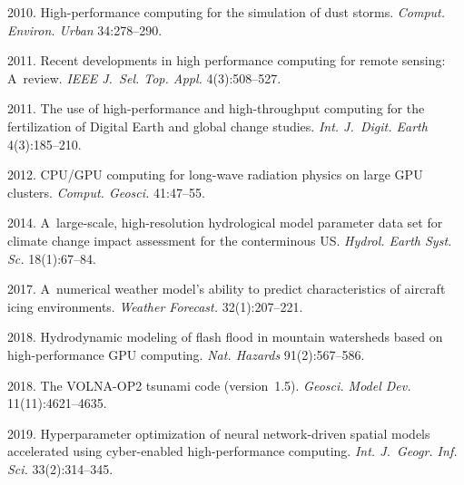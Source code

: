   \begin{multicols}{2}

\renewcommand{\bibname}{\protect\rmfamily References}

{\small\frenchspacing
 {%
 \begin{thebibliography}{99}
 2010. High-performance computing for the simulation of dust storms. 
 \textit{Comput. Environ. Urban} 34:278--290.

 2011. Recent developments in high performance computing for remote sensing: A~review. 
 \textit{IEEE J.~Sel. Top. Appl.} 4(3):508--527.

 2011. The use of high-performance 
and high-throughput computing for the fertilization of Digital
 Earth and global change studies. \textit{Int. J.~Digit. Earth} 4(3):185--210.

 2012. 
CPU/GPU computing for long-wave radiation physics on large GPU clusters. 
\textit{Comput. Geosci.} 41:47--55.

 2014. A~large-scale, high-resolution hydrological model parameter data set 
 for climate change impact assessment for the conterminous US. 
 \textit{Hydrol. Earth Syst. Sc.} 18(1):67--84.

 2017. A~numerical weather model's ability to predict characteristics of 
 aircraft icing environments. \textit{Weather Forecast.} 32(1):207--221.

 2018. Hydrodynamic modeling of flash flood 
in mountain watersheds based on high-performance GPU computing. 
\textit{Nat. Hazards} 91(2):567--586.

 2018. The VOLNA-OP2 tsunami code 
(version~1.5). \textit{Geosci. Model Dev.} 11(11):4621--4635.

2019. Hyperparameter optimization of neural network-driven spatial 
models accelerated using cyber-enabled high-performance computing. 
\textit{Int. J.~Geogr. Inf. Sci.} 33(2):314--345.


\end{thebibliography}}}
\end{multicols}
